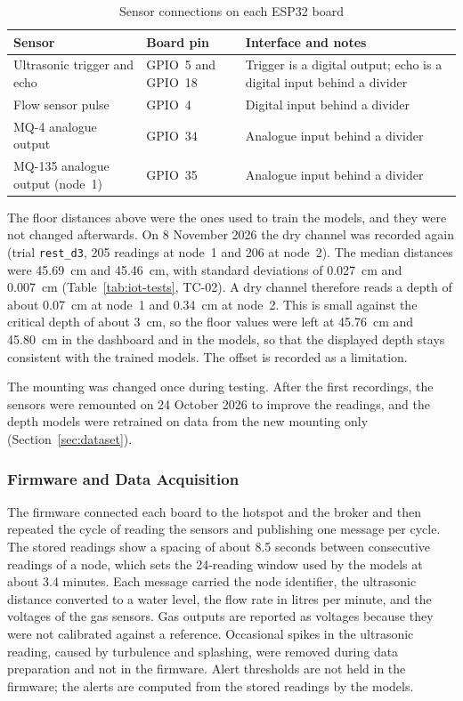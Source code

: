\documentclass[12pt, a4paper]{article}
\begin{document}
\begin{table}[H]
\centering

\begin{tabular}{|p{4.0cm}|p{3.0cm}|p{7.0cm}|}
\hline
\textbf{Sensor} & \textbf{Board pin} & \textbf{Interface and notes} \\
\hline
Ultrasonic trigger and echo & GPIO~5 and GPIO~18 & Trigger is a digital output; echo is a digital input behind a divider \\
\hline
Flow sensor pulse & GPIO~4 & Digital input behind a divider \\
\hline
MQ-4 analogue output & GPIO~34 & Analogue input behind a divider \\
\hline
MQ-135 analogue output (node~1) & GPIO~35 & Analogue input behind a divider \\
\hline
\end{tabular}
\caption{Sensor connections on each ESP32 board}
\label{tab:pins}
\end{table}

The floor distances above were the ones used to train the models, and they were not changed afterwards. On 8 November 2026 the dry channel was recorded again (trial \texttt{rest\_d3}, 205 readings at node~1 and 206 at node~2). The median distances were 45.69~cm and 45.46~cm, with standard deviations of 0.027~cm and 0.007~cm (Table~\ref{tab:iot-tests}, TC-02). A dry channel therefore reads a depth of about 0.07~cm at node~1 and 0.34~cm at node~2. This is small against the critical depth of about 3~cm, so the floor values were left at 45.76~cm and 45.80~cm in the dashboard and in the models, so that the displayed depth stays consistent with the trained models. The offset is recorded as a limitation.

The mounting was changed once during testing. After the first recordings, the sensors were remounted on 24 October 2026 to improve the readings, and the depth models were retrained on data from the new mounting only (Section~\ref{sec:dataset}).

\subsubsection{Firmware and Data Acquisition}

The firmware connected each board to the hotspot and the broker and then repeated the cycle of reading the sensors and publishing one message per cycle. The stored readings show a spacing of about 8.5 seconds between consecutive readings of a node, which sets the 24-reading window used by the models at about 3.4 minutes. Each message carried the node identifier, the ultrasonic distance converted to a water level, the flow rate in litres per minute, and the voltages of the gas sensors. Gas outputs are reported as voltages because they were not calibrated against a reference. Occasional spikes in the ultrasonic reading, caused by turbulence and splashing, were removed during data preparation and not in the firmware. Alert thresholds are not held in the firmware; the alerts are computed from the stored readings by the models.
\end{document}
